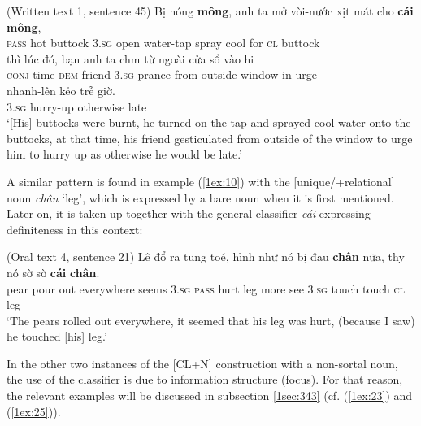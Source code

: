 \documentclass[output=paper]{langsci/langscibook}
\begin{document}
\begin{exe}
\ex\label{1ex:9}
(Written text 1, sentence 45)
\exi{}
\gll Bị         nóng   {\textbf{mông}},    {anh ta}  mở     vòi-nước    xịt      mát   cho   {\textbf{cái}}    {\textbf{mông}}, \\
{\textsc{pass}}   hot      buttock  {\textsc{3.sg}}    open   water-tap   spray cool  for     {\textsc{cl}}   buttock  \\
\glt 
\exi{}
\gll thì        lúc     đó,      bạn     {anh ta}   ch{\daob}m     từ      ngoài    {cửa sổ}    vào   h{\dao}i \\
{\textsc{conj}}  time   {\textsc{dem}}  friend  {\textsc{3.sg}}     prance   from outside  window  in     urge  \\
\glt 
\vspace*{-1mm}
\exi{} 
  nhanh-lên  kẻo           {trễ giờ}.  \\
3.{\textsc{sg}}    hurry-up    otherwise  late \\
\glt `[His] buttocks were burnt, he turned on the tap and sprayed cool water onto the buttocks, at that time, his friend gesticulated from outside of the window to urge him to hurry up as otherwise he would be late.'
\end{exe}

A similar pattern is found in example (\ref{1ex:10}) with the [\minus unique/+relational] noun {\emph{chân}} `leg', which is expressed by a bare noun when it is first mentioned. Later on, it is taken up together with the general classifier {\emph{cái}} expressing definiteness in this context:

\begin{exe}
\ex\label{1ex:10}
(Oral text 4, sentence 21) 
\exi{}
\gll Lê    đổ    ra    {tung toé},      {hình như}  nó     bị         đau   {\textbf{chân}}  nữa,   th{\daa}y  nó sờ       sờ       {\textbf{cái}}   {\textbf{chân}}. \\
pear pour out  everywhere seems       3.{\textsc{sg}}   {\textsc{pass}} hurt  leg     more  see   3.{\textsc{sg}} touch  touch  {\textsc{cl}}   leg \\
\glt `The pears rolled out everywhere, it seemed that his leg was hurt, (because I saw) he touched [his] leg.'
\end{exe}

{
In the other two instances of the [CL+N] construction with a non-sortal noun, the use of the classifier is due to information structure (focus). For that reason, the relevant examples will be discussed in subsection \ref{1sec:343} (cf. (\ref{1ex:23}) and (\ref{1ex:25})).
}
\end{document}
